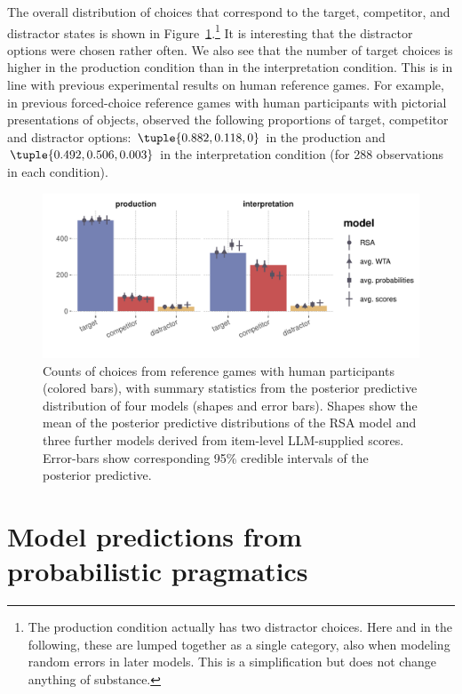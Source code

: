 \documentclass[fleqn]{article}
\begin{document}
The overall distribution of choices that correspond to the target, competitor, and distractor states is shown in Figure~\ref{fig:refgame-counts}.\footnote{
  The production condition actually has two distractor choices.
  Here and in the following, these are lumped together as a single category, also when modeling random errors in later models.
  This is a simplification but does not change anything of substance.}
It is interesting that the distractor options were chosen rather often.
We also see that the number of target choices is higher in the production condition than in the interpretation condition.
This is in line with previous experimental results on human reference games.
For example, in previous forced-choice reference games with human participants with pictorial presentations of objects, \citet{QingFranke2013:Variations-on-a} observed the following proportions of target, competitor and distractor options: $\tuple{0.882, 0.118, 0}$ in the production and $\tuple{0.492, 0.506, 0.003}$ in the interpretation condition (for 288 observations in each condition).

\begin{figure}[t]
  \centering

    \includegraphics[width=0.9\linewidth]{00-pics/PPC-alpha-eps-model.pdf}

    \caption{Counts of choices from reference games with human participants (colored bars), with summary statistics from the posterior predictive distribution of four models (shapes and error bars).
      Shapes show the mean of the posterior predictive distributions of the RSA model and three further models derived from item-level LLM-supplied scores.
      Error-bars show corresponding 95\% credible intervals of the posterior predictive.
    }
  \label{fig:refgame-counts}
\end{figure}


\section{Model predictions from probabilistic pragmatics}
\label{sec:model-pred-from}
\end{document}
